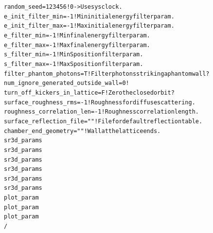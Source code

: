 \documentclass[11pt,openany]{report}
\newlength{\ExBeg}
\newlength{\ExEnd}
\newenvironment{example}
  {\vspace{\ExBeg} \begin{alltt}}
  {\end{alltt} \vspace{\ExEnd}}
\begin{document}
\begin{example}
    random_seed = 123456             ! 0 -> Use sys clock.
    e_init_filter_min = -1           ! Min initial energy filter param.
    e_init_filter_max = -1           ! Max initial energy filter param.
    e_filter_min = -1                ! Min final energy filter param.
    e_filter_max = -1                ! Max final energy filter param.
    s_filter_min = -1                ! Min S position filter param.
    s_filter_max = -1                ! Max S position filter param.
    filter_phantom_photons = T       ! Filter photons striking a phantom wall?
    num_ignore_generated_outside_wall = 0    !
    turn_off_kickers_in_lattice = F          ! Zero the closed orbit?
    surface_roughness_rms       = -1         ! Roughness for diffuse scattering.
    roughness_correlation_len   = -1         ! Roughness correlation length.
    surface_reflection_file     = ""         ! File for default reflection table.
    chamber_end_geometry = ""                   ! Wall at the lattice ends.
    sr3d_params%
    sr3d_params%
    sr3d_params%
    sr3d_params%
    sr3d_params%
    sr3d_params%
    plot_param%
    plot_param%
    plot_param%
  /
\end{example}
\end{document}
